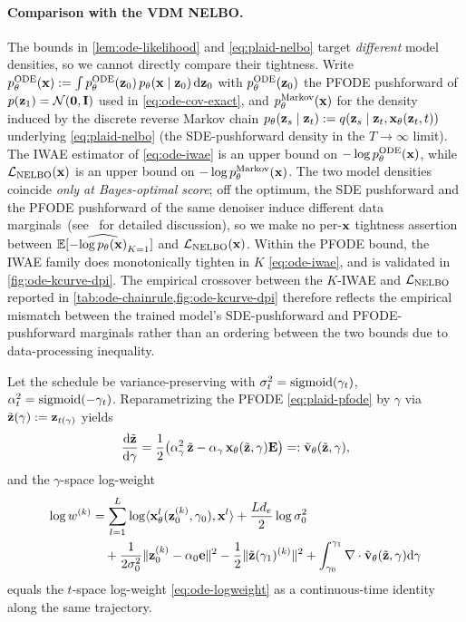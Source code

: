 \documentclass{article}
\begin{document}
\paragraph{Comparison with the VDM NELBO.}The bounds in \cref{lem:ode-likelihood} and \cref{eq:plaid-nelbo} target \textit{different} model densities, so we cannot directly compare their tightness. Write $p_\theta^{\mathrm{ODE}}({\mathbf x}) := \int p_\theta^{\mathrm{ODE}}({\mathbf z}_0)\,p_\theta({\mathbf x} \mid {\mathbf z}_0)\,{\mathrm{d}}{\mathbf z}_0$ with $p_\theta^{\mathrm{ODE}}({\mathbf z}_0)$ the PFODE pushforward of $p({\mathbf z}_1) = \mathcal{N}({\mathbf 0}, {\mathbf I})$ used in \cref{eq:ode-cov-exact}, and $p_\theta^{\mathrm{Markov}}({\mathbf x})$ for the density induced by the discrete reverse Markov chain $p_\theta({\mathbf z}_{s} \mid {\mathbf z}_{t}) := q({\mathbf z}_{s} \mid {\mathbf z}_{t}, {\mathbf x}_\theta({\mathbf z}_{t}, t))$ underlying \cref{eq:plaid-nelbo} (the SDE-pushforward density in the $T \to \infty$ limit). The IWAE estimator of \cref{eq:ode-iwae} is an upper bound on $-\log p_\theta^{\mathrm{ODE}}({\mathbf x})$, while $\mathcal{L}_{\mathrm{NELBO}}({\mathbf x})$ is an upper bound on $-\log p_\theta^{\mathrm{Markov}}({\mathbf x})$. The two model densities coincide \textit{only at Bayes-optimal score}; off the optimum, the SDE pushforward and the PFODE pushforward of the same denoiser induce different data marginals~(see~\citet[Sec. 4]{song2021maximum} for detailed discussion), so we make no per-${\mathbf x}$ tightness assertion between $\mathbb{E}[-\widehat{\log p_\theta({\mathbf x})}_{K=1}]$ and $\mathcal{L}_{\mathrm{NELBO}}({\mathbf x})$. Within the PFODE bound, the IWAE family does monotonically tighten in $K$ \cref{eq:ode-iwae}, and is validated in \cref{fig:ode-kcurve-dpi}. The empirical crossover between the $K$-IWAE and $\mathcal{L}_{\mathrm{NELBO}}$ reported in \cref{tab:ode-chainrule,fig:ode-kcurve-dpi} therefore reflects the empirical mismatch between the trained model's SDE-pushforward and PFODE-pushforward marginals rather than an ordering between the two bounds due to data-processing inequality.
%

\begin{lemma}\label{lem:ode-gamma}
Let the schedule be variance-preserving with $\sigma_t^2 = \operatorname{sigmoid}(\gamma_t)$, $\alpha_t^2 = \operatorname{sigmoid}(-\gamma_t)$. Reparametrizing the PFODE \cref{eq:plaid-pfode} by $\gamma$ via $\tilde{{\mathbf z}}(\gamma) := {\mathbf z}_{t(\gamma)}$ yields
\begin{equation}\label{eq:ode-pfode-gamma}
  \frac{{\mathrm{d}}\tilde{{\mathbf z}}}{{\mathrm{d}}\gamma} = \frac{1}{2}\bigl(\alpha_\gamma^2\, \tilde{{\mathbf z}} - \alpha_\gamma\, {\mathbf x}_\theta(\tilde{{\mathbf z}},\gamma){\mathbf E}\bigr) =: \tilde{{\mathbf v}}_\theta(\tilde{{\mathbf z}},\gamma),
\end{equation}
and the $\gamma$-space log-weight
\begin{align}\label{eq:ode-logweight-gamma}
  \log w^{(k)} &= \sum_{l=1}^L \log\langle{\mathbf x}_\theta^l({\mathbf z}_0^{(k)},\gamma_0), {\mathbf x}^l\rangle + \frac{Ld_e}{2}\log\sigma_0^2 \notag\\
  &\quad + \frac{1}{2\sigma_0^2}\|{\mathbf z}_0^{(k)}-\alpha_0{\mathbf e}\|^2 - \frac{1}{2}\|\tilde{{\mathbf z}}(\gamma_1)^{(k)}\|^2 + \int_{\gamma_0}^{\gamma_1} \nabla\cdot \tilde{{\mathbf v}}_\theta(\tilde{{\mathbf z}},\gamma){\mathrm{d}}\gamma
\end{align}
equals the $t$-space log-weight \cref{eq:ode-logweight} as a continuous-time identity along the same trajectory.
\end{lemma}
\end{document}
